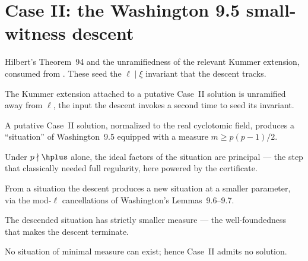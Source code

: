 \section{Case II: the Washington 9.5 small-witness descent}\label{sec:descent}

\begin{definition}\label{ext:hilbert94}
  \leanok
  Hilbert's Theorem~94 and the unramifiedness of the relevant Kummer extension,
  consumed from . These seed the $\ell \mid \xi$ invariant that
  the descent tracks.
\end{definition}

\begin{theorem}\label{thm:kummerunram}
  \leanok
  The Kummer extension attached to a putative Case~II solution is unramified away
  from $\ell$, the input the descent invokes a second time to seed its invariant.
\end{theorem}

\begin{theorem}\label{thm:situation}
  \leanok
  A putative Case~II solution, normalized to the real cyclotomic field, produces a
  ``situation'' of Washington~9.5 equipped with a measure $m \ge p(p-1)/2$.
\end{theorem}

\begin{theorem}\label{thm:principal96}
  \leanok
  Under $p \nmid \hplus$ alone, the ideal factors of the situation are principal ---
  the step that classically needed full regularity, here powered by the certificate.
\end{theorem}

\begin{theorem}\label{thm:descentstep}
  \leanok
  From a situation the descent produces a new situation at a smaller parameter,
  via the mod-$\ell$ cancellations of Washington's Lemmas~9.6--9.7.
\end{theorem}

\begin{theorem}\label{thm:measdecrease}
  \leanok
  The descended situation has strictly smaller measure --- the well-foundedness
  that makes the descent terminate.
\end{theorem}

\begin{theorem}\label{thm:nosituation}
  \leanok
  No situation of minimal measure can exist; hence Case~II admits no solution.
\end{theorem}
